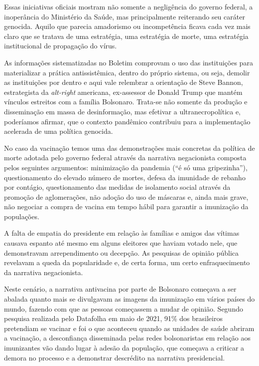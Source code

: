 Essas iniciativas oficiais mostram não somente a negligência do governo
federal, a inoperância do Ministério da Saúde, mas principalmente
reiterando seu caráter genocida. Aquilo que parecia amadorismo ou
incompetência ficava cada vez mais claro que se tratava de uma
estratégia, uma estratégia de morte, uma estratégia institucional de
propagação do vírus.

As informações sistematizadas no Boletim comprovam o uso das
instituições para materializar a prática antissistêmica, dentro do
próprio sistema, ou seja, demolir as instituições por dentro e aqui vale
relembrar a orientação de Steve Bannon, estrategista da \textit{\textit{alt-right}}
americana, ex-assessor de Donald Trump que mantém vínculos estreitos com
a família Bolsonaro. Trata-se não somente da produção e disseminação em
massa de desinformação, mas efetivar a ultranecropolítica e, poderíamos
afirmar, que o contexto pandêmico contribuiu para a implementação
acelerada de uma política genocida.

No caso da vacinação temos uma das demonstrações mais concretas da
política de morte adotada pelo governo federal através da narrativa
negacionista composta pelos seguintes argumentos: minimização da
pandemia (``é só uma gripezinha''), questionamento do elevado número de
mortes, defesa da imunidade de rebanho por contágio, questionamento das
medidas de isolamento social através da promoção de aglomerações, não
adoção do uso de máscaras e, ainda mais grave, não negociar a compra de
vacina em tempo hábil para garantir a imunização da populações.

A falta de empatia do presidente em relação às famílias e amigos das
vítimas causava espanto até mesmo em alguns eleitores que haviam votado
nele, que demonstravam arrependimento ou decepção. As pesquisas de
opinião pública revelavam a queda da popularidade e, de certa forma, um
certo enfraquecimento da narrativa negacionista.

Neste cenário, a narrativa antivacina por parte de Bolsonaro começava a
ser abalada quanto mais se divulgavam as imagens da imunização em vários
países do mundo, fazendo com que as pessoas começassem a mudar de
opinião. Segundo pesquisa realizada pelo Datafolha em maio de 2021, 91\%
dos brasileiros pretendiam se vacinar e foi o que aconteceu quando as
unidades de saúde abriram a vacinação, a desconfiança disseminada pelas
redes bolsonaristas em relação aos imunizantes vão dando lugar à adesão
da população, que começava a criticar a demora no processo e a
demonstrar descrédito na narrativa presidencial.


